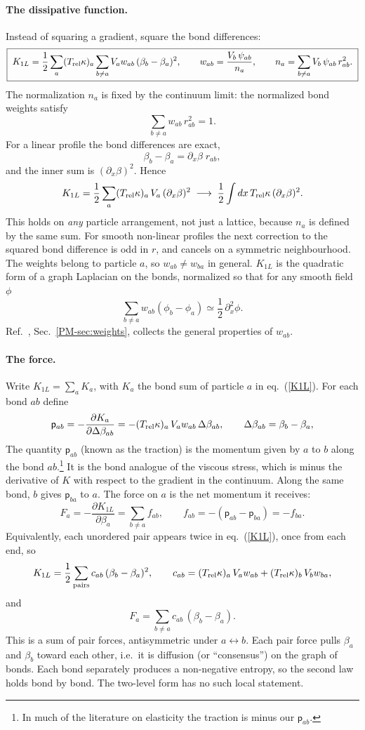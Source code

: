 \documentclass[11pt,aps,preprint,nofootinbib,superscriptaddress,tightenlines]{revtex4-2}
\def\st{\begin{equation}}
\def\stp{\end{equation}}
\def\Eq#1{eq.~(\ref{#1})}
\let\oldparagraph\paragraph
\renewcommand{\paragraph}{\par\bigskip\oldparagraph}
\begin{document}
\paragraph{The dissipative function.}
Instead of squaring a gradient, square the bond differences:
\st
\boxed{\;K_{1L}=\frac12\sum_a(T_{\rm rel}\kappa)_a\sum_{b\neq a}V_aw_{ab}\,
(\beta_b-\beta_a)^2,\qquad
w_{ab}=\frac{V_b\,\psi_{ab}}{n_a},\qquad
n_a=\sum_{b\neq a}V_b\,\psi_{ab}\,r_{ab}^2 .\;}
\label{K1L}
\stp
The normalization $n_a$ is fixed by the continuum limit: the normalized bond
weights satisfy
\st
\sum_{b\neq a}w_{ab}\,r_{ab}^2=1 .
\stp
For a linear
profile the bond differences are exact,
\st
\beta_b-\beta_a=\partial_x\beta\;r_{ab},
\stp
and the inner sum is $(\partial_x\beta)^2$.  Hence
\st
K_{1L}=\frac12\sum_a(T_{\rm rel}\kappa)_a\,V_a\,(\partial_x\beta)^2
\;\longrightarrow\;\frac12\int dx\,T_{\rm rel}\kappa\,(\partial_x\beta)^2 .
\stp
This holds on \emph{any} particle arrangement, not just a lattice, because
$n_a$ is defined by the same sum.  For smooth non-linear profiles the next
correction to the squared bond difference is odd in $r$, and cancels on a
symmetric neighbourhood.  The weights belong to particle $a$, so $w_{ab}\neq
w_{ba}$ in general.  $K_{1L}$ is the quadratic form of a graph Laplacian on the
bonds, normalized so that for any smooth field $\phi$
\st
\sum_{b\neq a}w_{ab}(\phi_b-\phi_a)\simeq\frac12\,\partial_x^2\phi .
\stp
Ref.~\cite{ParticleMetrics}, Sec.~\ref{PM-sec:weights}, collects the general
properties of $w_{ab}$.

\paragraph{The force.}
Write $K_{1L}=\sum_aK_a$, with $K_a$ the bond sum of particle $a$ in \Eq{K1L}.
For each bond $ab$ define
\st
\mathsf p_{ab}=-\frac{\partial K_a}{\partial\Delta\beta_{ab}}
=-(T_{\rm rel}\kappa)_a\,V_aw_{ab}\,\Delta\beta_{ab},\qquad
\Delta\beta_{ab}=\beta_b-\beta_a ,
\label{tab}
\stp
The quantity $\mathsf p_{ab}$ (known as the traction) is the momentum given by
$a$ to $b$ along the bond $ab$.\footnote{In much of the literature on
elasticity the traction is minus our $\mathsf p_{ab}$.}  It is the bond analogue of
the viscous stress, which is minus the derivative of $K$ with respect to the
gradient in the continuum.  Along the same bond, $b$ gives $\mathsf p_{ba}$ to $a$.
The force on $a$ is the net momentum it receives:
\st
F_a=-\frac{\partial K_{1L}}{\partial\beta_a}=\sum_{b\neq a}f_{ab},\qquad f_{ab}=-(\mathsf p_{ab}-\mathsf p_{ba})=-f_{ba}.
\label{Fa}
\stp
Equivalently, each unordered pair appears twice in \Eq{K1L}, once from each end, so
\st
K_{1L}=\frac12\sum_{\rm pairs}c_{ab}\,(\beta_b-\beta_a)^2,\qquad
c_{ab}=(T_{\rm rel}\kappa)_a\,V_aw_{ab}+(T_{\rm rel}\kappa)_b\,V_bw_{ba} ,
\label{Kpairs}
\stp
and
\st
F_a=\sum_{b\neq a}c_{ab}\,(\beta_b-\beta_a).
\label{f1L}
\stp
This is a sum of pair forces, antisymmetric under $a\leftrightarrow b$.  Each
pair force pulls $\beta_a$ and $\beta_b$ toward each other, i.e.\ it is
diffusion (or ``consensus'') on the graph of bonds.  Each bond separately
produces a non-negative entropy, so the second law holds bond by bond.  The two-level form has no such local statement.
\end{document}
